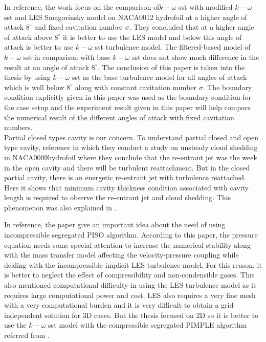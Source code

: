 In reference, \cite{Zhao2021} the work focus on the comparison of$k-\omega
$ sst with modified $k-\omega$ sst and LES Smagorinsky model on
NACA0012 hydrofoil at a higher angle of attack $8^{\circ}$ and fixed
cavitation number $\sigma$. They concluded that at a higher angle of
attack above $8^\circ$ it is better to use the LES model and
below this angle of attack is better to use $k-\omega$ sst turbulence
model. The filtered-based model of $k-\omega $ sst in comparison with
base $k-\omega$ sst does not show much difference in the result at an angle of attack $8^\circ$. The conclusion 
of this paper is taken into the thesis by using  $k-\omega$ sst as the base turbulence model for all
angles of attack which is well below $8^\circ$ along with constant
cavitation number $\sigma$. The boundary condition explicitly given in
this paper was used as the boundary condition for the case setup and
the experiment result given in this paper will help compare the numerical result of the different angles of attack with
fixed cavitation numbers.\\

Partial closed types cavity is our concern.
To understand partial closed and open type cavity, reference
\cite{ceccio2001} in which they conduct a study on unsteady cloud
shedding in NACA0009hydrofoil where they conclude that the re-entrant
jet was the week in the open cavity and there will be turbulent
reattachment. But in the closed partial cavity, there is an energetic
re-entrant jet with turbulence reattached. Here it shows that minimum
cavity thickness condition associated with cavity length is required
to observe the re-entrant jet and cloud shedding. This phenomenon was also explained in \cite{FundamentalsofCavitation.2004}. 

In  reference, \cite{Bensow2010} the paper give
an important idea about the need of using incompressible segregated
PISO algorithm. According to this paper, the pressure
equation needs some special attention to increase the numerical
stability along with the mass transfer model affecting the
velocity-pressure coupling while dealing with the incompressible implicit LES turbulence model. For this reason, it is better to neglect the effect of
compressibility and non-condensible gases. This also mentioned computational
difficulty in using the LES turbulence model as it requires large
computational power and cost. LES also requires a very fine mesh with a
very computational burden and it is very difficult to obtain a
grid-independent solution \cite{ZHANG2017} for 3D cases. But the thesis
 focused on 2D so it is better to use the $k-\omega $  sst model with the compressible segregated PIMPLE algorithm 
referred from \cite{Zhao2021}.  

